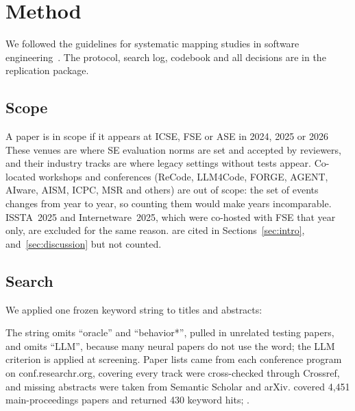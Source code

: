 \section{Method}
\label{sec:method}

We followed the guidelines for systematic mapping studies in software engineering~\cite{petersen}. The protocol, search log, codebook and all decisions are in the replication package.

\subsection{Scope}
\label{sec:scope}

A paper is in scope if it appears at ICSE, FSE or ASE in 2024, 2025 or 2026  These venues are where SE evaluation norms are set and accepted by reviewers, and their industry tracks are where legacy settings without tests appear. Co-located workshops and conferences (ReCode, LLM4Code, FORGE, AGENT, AIware, AISM, ICPC, MSR and others) are out of scope: the set of events changes from year to year, so counting them would make years incomparable. ISSTA~2025 and Internetware~2025, which were co-hosted with FSE that year only, are excluded for the same reason.  are cited in Sections~\ref{sec:intro}, \new{\ref{sec:related}} and~\ref{sec:discussion} but not counted.

\subsection{Search}
\label{sec:search}

We applied one frozen keyword string to titles and abstracts:
\begin{center}
\end{center}
The string omits ``oracle'' and ``behavior*'',  pulled in unrelated testing papers, and omits ``LLM'', because many neural papers do not use the word; the LLM criterion is applied at screening. Paper lists came from each conference program on conf.researchr.org, covering every track  were cross-checked through Crossref, and missing abstracts were taken from Semantic Scholar and arXiv.  covered 4,451 main-proceedings papers and returned 430 keyword hits; .


